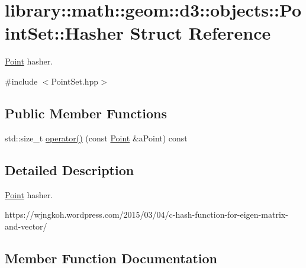 \hypertarget{structlibrary_1_1math_1_1geom_1_1d3_1_1objects_1_1_point_set_1_1_hasher}{}\section{library\+:\+:math\+:\+:geom\+:\+:d3\+:\+:objects\+:\+:Point\+Set\+:\+:Hasher Struct Reference}
\label{structlibrary_1_1math_1_1geom_1_1d3_1_1objects_1_1_point_set_1_1_hasher}


\hyperlink{classlibrary_1_1math_1_1geom_1_1d3_1_1objects_1_1_point}{Point} hasher.  




{\ttfamily \#include $<$Point\+Set.\+hpp$>$}

\subsection*{Public Member Functions}
\begin{DoxyCompactItemize}
\item 
std\+::size\+\_\+t \hyperlink{structlibrary_1_1math_1_1geom_1_1d3_1_1objects_1_1_point_set_1_1_hasher_a9d3ba23414667bec4ef50ac8842f96a0}{operator()} (const \hyperlink{classlibrary_1_1math_1_1geom_1_1d3_1_1objects_1_1_point}{Point} \&a\+Point) const
\end{DoxyCompactItemize}


\subsection{Detailed Description}
\hyperlink{classlibrary_1_1math_1_1geom_1_1d3_1_1objects_1_1_point}{Point} hasher. 

https\+://wjngkoh.wordpress.\+com/2015/03/04/c-\/hash-\/function-\/for-\/eigen-\/matrix-\/and-\/vector/ 

\subsection{Member Function Documentation}
\mbox{\label{structlibrary_1_1math_1_1geom_1_1d3_1_1objects_1_1_point_set_1_1_hasher_a9d3ba23414667bec4ef50ac8842f96a0}} 
